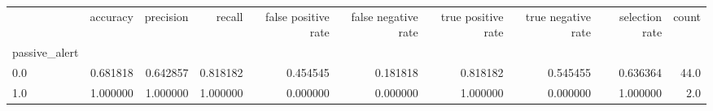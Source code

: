 \begin{tabular}{lrrrrrrrrr}
\toprule
{} &  accuracy &  precision &    recall &  false positive rate &  false negative rate &  true positive rate &  true negative rate &  selection rate &  count \\
passive\_alert &           &            &           &                      &                      &                     &                     &                 &        \\
\midrule
0.0           &  0.681818 &   0.642857 &  0.818182 &             0.454545 &             0.181818 &            0.818182 &            0.545455 &        0.636364 &   44.0 \\
1.0           &  1.000000 &   1.000000 &  1.000000 &             0.000000 &             0.000000 &            1.000000 &            0.000000 &        1.000000 &    2.0 \\
\bottomrule
\end{tabular}
